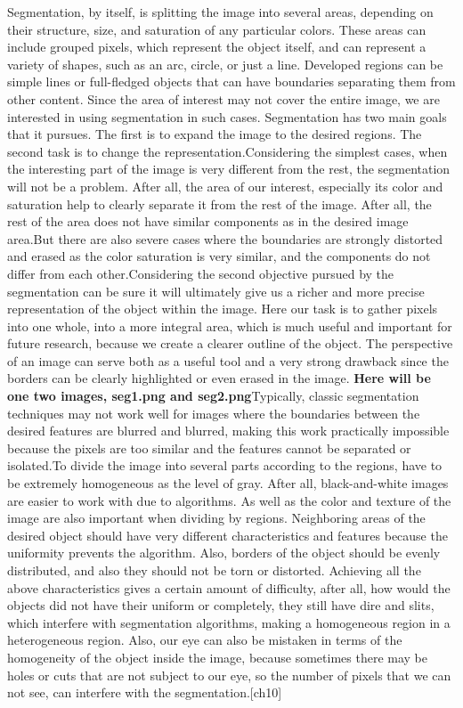 \vspace{-0.5cm}
\par
\noindent Segmentation, by itself, is splitting the image into several areas, depending on their structure, size, and saturation of any particular colors. These areas can include grouped pixels, which represent the object itself, and can represent a variety of shapes, such as an arc, circle, or just a line. Developed regions can be simple lines or full-fledged objects that can have boundaries separating them from other content. Since the area of interest may not cover the entire image, we are interested in using segmentation in such cases. Segmentation has two main goals that it pursues. The first is to expand the image to the desired regions. The second task is to change the representation.Considering the simplest cases, when the interesting part of the image is very different from the rest, the segmentation will not be a problem. After all, the area of our interest, especially its color and saturation help to clearly separate it from the rest of the image. After all, the rest of the area does not have similar components as in the desired image area.But there are also severe cases where the boundaries are strongly distorted and erased as the color saturation is very similar, and the components do not differ from each other.Considering the second objective pursued by the segmentation can be sure it will ultimately give us a richer and more precise representation of the object within the image. Here our task is to gather pixels into one whole, into a more integral area, which is much useful and important for future research, because we create a clearer outline of the object. The perspective of an image can serve both as a useful tool and a very strong drawback since the borders can be clearly highlighted or even erased in the image. \textbf{Here will be one two images, seg1.png and seg2.png}Typically, classic segmentation techniques may not work well for images where the boundaries between the desired features are blurred and blurred, making this work practically impossible because the pixels are too similar and the features cannot be separated or isolated.To divide the image into several parts according to the regions, have to be extremely homogeneous as the level of gray. After all, black-and-white images are easier to work with due to algorithms. As well as the color and texture of the image are also important when dividing by regions. Neighboring areas of the desired object should have very different characteristics and features because the uniformity prevents the algorithm. Also, borders of the object should be evenly distributed, and also they should not be torn or distorted. Achieving all the above characteristics gives a certain amount of difficulty, after all, how would the objects did not have their uniform or completely, they still have dire and slits, which interfere with segmentation algorithms, making a homogeneous region in a heterogeneous region. Also, our eye can also be mistaken in terms of the homogeneity of the object inside the image, because sometimes there may be holes or cuts that are not subject to our eye, so the number of pixels that we can not see, can interfere with the segmentation.[ch10]


